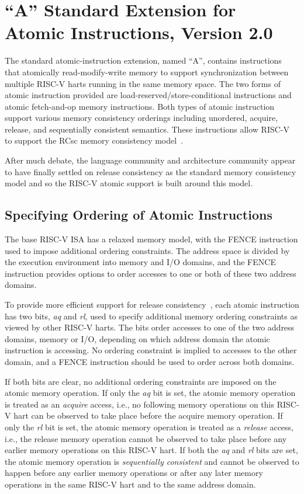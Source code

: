 \chapter{``A'' Standard Extension for Atomic Instructions, Version 2.0}
\label{atomics}

The standard atomic-instruction extension, named ``A'',
contains instructions that atomically
read-modify-write memory to support synchronization between multiple
RISC-V harts running in the same memory space.  The two forms of
atomic instruction provided are load-reserved/store-conditional
instructions and atomic fetch-and-op memory instructions.  Both types
of atomic instruction support various memory consistency orderings
including unordered, acquire, release, and sequentially consistent
semantics.  These instructions allow RISC-V to support the RCsc memory
consistency model~\cite{Gharachorloo90memoryconsistency}.

\begin{commentary}
After much debate, the language community and architecture community
appear to have finally settled on release consistency as the standard
memory consistency model and so the RISC-V atomic support is built
around this model.
\end{commentary}

\section{Specifying Ordering of Atomic Instructions}

The base RISC-V ISA has a relaxed memory model, with the FENCE
instruction used to impose additional ordering constraints.  The
address space is divided by the execution environment into memory and
I/O domains, and the FENCE instruction provides options to order
accesses to one or both of these two address domains.

To provide more efficient support for release
consistency~\cite{Gharachorloo90memoryconsistency}, each atomic
instruction has two bits, {\em aq} and {\em rl}, used to specify
additional memory ordering constraints as viewed by other RISC-V
harts.  The bits order accesses to one of the two address domains,
memory or I/O, depending on which address domain the atomic
instruction is accessing.  No ordering constraint is implied to
accesses to the other domain, and a FENCE instruction should be used
to order across both domains.

If both bits are clear, no additional ordering constraints are imposed
on the atomic memory operation.  If only the {\em aq} bit is set, the
atomic memory operation is treated as an {\em acquire} access, i.e.,
no following memory operations on this RISC-V hart can be observed
to take place before the acquire memory operation.  If only the {\em
  rl} bit is set, the atomic memory operation is treated as a {\em
  release} access, i.e., the release memory operation cannot be
observed to take place before any earlier memory operations on this
RISC-V hart.  If both the {\em aq} and {\em rl} bits are set, the
atomic memory operation is {\em sequentially consistent} and cannot be
observed to happen before any earlier memory operations or after any
later memory operations in the same RISC-V hart and to the same
address domain.

